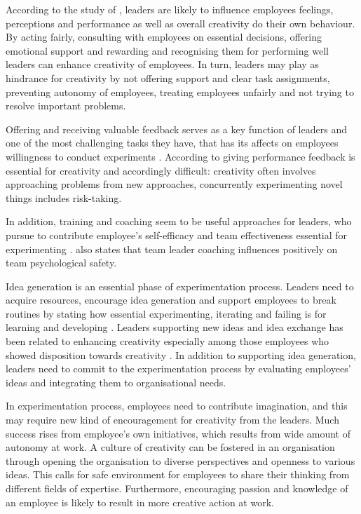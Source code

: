 According to the study of \citet{amabile2004leader}, leaders are likely to influence employees feelings, perceptions and performance as well as overall creativity do their own behaviour. By acting fairly, consulting with employees on essential decisions, offering emotional support and rewarding and recognising them for performing well leaders can enhance creativity of employees. In turn, leaders may play as hindrance for creativity by not offering support and clear task assignments, preventing autonomy of employees, treating employees unfairly and not trying to resolve important problems. 

Offering and receiving valuable feedback serves as a key function of leaders and one of the most challenging tasks they have, that has its affects on employees willingness to conduct experiments \citep{amabile2004leader,amabile1998kill}. According to \citet{shalley2004leaders} giving performance feedback is essential for creativity and accordingly difficult: creativity often involves approaching problems from new approaches, concurrently experimenting novel things includes risk-taking. 

In addition, training and coaching seem to be useful approaches for leaders, who pursue to contribute employee's self-efficacy and team effectiveness essential for experimenting \citep{amabile1998kill}. \citet{edmondson1999psychological} also states that team leader coaching influences positively on team psychological safety. 

Idea generation is an essential phase of experimentation process. Leaders need to acquire resources, encourage idea generation \citep{mcgourty1996managing} and support employees to break routines by stating how essential experimenting, iterating and failing is for learning and developing \citep{amabile2008creativity,shalley2004leaders}. Leaders supporting new ideas and idea exchange has been related to enhancing creativity especially among those employees who showed disposition towards creativity \citep{oldham1996employee}. In addition to supporting idea generation, leaders need to commit to the experimentation process by evaluating employees' ideas and integrating them to organisational needs\citep{mumford2002leading}.

In experimentation process, employees need to contribute imagination, and this may require new kind of encouragement for creativity from the leaders. Much success rises from employee's own initiatives, which results from wide amount of autonomy at work. \citep{amabile2008creativity} A culture of creativity can be fostered in an organisation through opening the organisation to diverse perspectives and openness to various ideas. This calls for safe environment for employees to share their thinking from different fields of expertise. Furthermore, encouraging passion and knowledge of an employee is likely to result in more creative action at work. \citep{amabile2008creativity}

